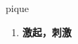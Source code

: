 
\begin{frame}
{\huge pique}
\begin{center}
\begin{enumerate}\Large
  \item \textbf{激起，刺激}
\end{enumerate}
\end{center}
\end{frame}
